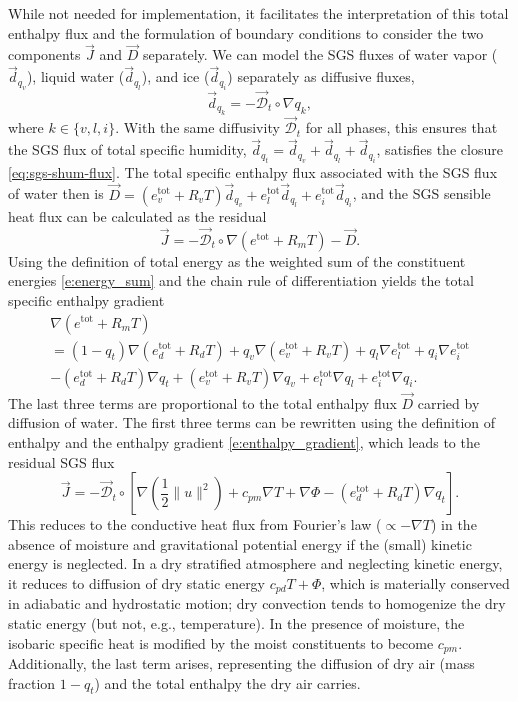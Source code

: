 \documentclass{report}
\begin{document}
While not needed for implementation, it facilitates the interpretation of this total enthalpy flux and the formulation of boundary conditions to consider the two components $\vec{J}$ and $\vec{D}$ separately. We can model the SGS fluxes of water vapor ($\vec{d}_{q_v}$), liquid water ($\vec{d}_{q_l}$), and ice ($\vec{d}_{q_i}$) separately as diffusive fluxes, 
\begin{equation}\label{e:water_diffusion}
    \vec{d}_{q_k} = - \vec{\mathcal{D}}_t \circ \nabla q_k,
\end{equation}
where $k \in \{v, l, i\}$. With the same diffusivity $\vec{\mathcal{D}}_t$ for all phases, this ensures that the SGS flux of total specific humidity, $\vec{d}_{q_t} = \vec{d}_{q_v} + \vec{d}_{q_l} + \vec{d}_{q_i}$, satisfies the closure \eqref{eq:sgs-shum-flux}. The total specific enthalpy flux associated with the SGS flux of water then is $\vec{D} = (e_v^{\mathrm{tot}} + R_v T) \vec{d}_{q_v} + e_l^{\mathrm{tot}} \vec{d}_{q_l} +  e_i^{\mathrm{tot}} \vec{d}_{q_i}$,
and the SGS sensible heat flux can be calculated as the residual
\[
    \vec{J} = - \vec{\mathcal{D}}_t \circ \nabla (e^{\mathrm{tot}} + R_m T) - \vec{D}.
\]
Using the definition of total energy as the weighted sum of the constituent energies \eqref{e:energy_sum} and the chain rule of differentiation yields the total specific enthalpy gradient
\begin{multline*}
\nabla (e^{\mathrm{tot}} + R_m T) \\
= (1-q_t)\nabla (e_d^{\mathrm{tot}} + R_d T) + q_v \nabla (e_v^{\mathrm{tot}} + R_v T) + q_l \nabla e_l^{\mathrm{tot}} + q_i \nabla e_i^{\mathrm{tot}} \\
- (e_d^{\mathrm{tot}} + R_d T) \nabla q_t + (e_v^{\mathrm{tot}} + R_v T) \nabla q_v + e_l^{\mathrm{tot}}\nabla q_l + e_i^{\mathrm{tot}} \nabla q_i.
\end{multline*}
The last three terms are proportional to the total enthalpy flux $\vec{D}$ carried by diffusion of water. The first three terms can be rewritten using the definition of enthalpy and the enthalpy gradient \eqref{e:enthalpy_gradient}, which leads to the residual SGS flux
\begin{equation}\label{e:sgs_heat_flux}
\vec{J} = - \vec{\mathcal{D}}_t \circ \left[ \nabla \left( \frac{1}{2} \| u \|^2 \right) + c_{pm} \nabla T + \nabla \Phi - (e_d^{\mathrm{tot}} + R_d T) \nabla q_t \right].
\end{equation}
This reduces to the conductive heat flux from Fourier's law ($\propto -\nabla T$) in the absence of moisture and gravitational potential energy if the (small) kinetic energy is neglected. In a dry stratified atmosphere and neglecting kinetic energy, it reduces to diffusion of dry static energy $c_{pd} T + \Phi$, which is materially conserved in adiabatic and hydrostatic motion; dry convection tends to homogenize the dry static energy (but not, e.g., temperature). In the presence of moisture, the isobaric specific heat is modified by the moist constituents to become $c_{pm}$. Additionally, the last term arises, representing the diffusion of dry air (mass fraction $1-q_t$) and the total enthalpy the dry air carries.
\end{document}
